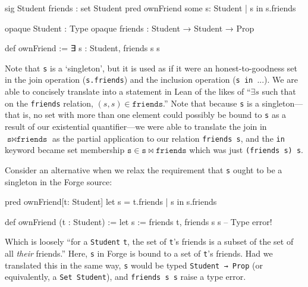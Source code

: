 \vspace{0.5em}
\noindent\begin{minipage}{0.5\textwidth}
\begin{forge*}
sig Student {
  friends : set Student
}
pred ownFriend {
  some s: Student |
    s in s.friends
}
\end{forge*}
\end{minipage}%
\begin{minipage}{0.5\textwidth}
\begin{lean*}
opaque Student : Type
opaque friends : Student → Student → Prop

def ownFriend := 
  ∃ s : Student, 
    friends s s

\end{lean*}
\end{minipage}
\vspace{0.5em}\newline
Note that \texttt{s} is a `singleton', but it is used as if it were an honest-to-goodness set in the join operation (\texttt{s.friends}) and the inclusion operation (\texttt{s in }...). We are able to concisely translate into a statement in Lean of the likes of ``$\exists s$ such that on the \texttt{friends} relation, $(s,s)\in \texttt{friends}$.'' Note that because \texttt{s} is a singleton---that is, no set with more than one element could possibly be bound to \texttt{s} as a result of our existential quantifier---we were able to translate the join in $\texttt{s} \bowtie \texttt{friends}$ as the partial application to our relation \texttt{friends s}, and the \texttt{in} keyword became set membership $\texttt{s}\in \texttt{s} \bowtie \texttt{friends}$ which was just \texttt{(friends s) s}. 

Consider an alternative when we relax the requirement that \texttt{s} ought to be a singleton in the Forge source: 

\vspace{0.5em}
\noindent\begin{minipage}{0.5\textwidth}
\begin{forge*}
pred ownFriend[t: Student] {
  let s = t.friends |
    s in s.friends
}
\end{forge*}
\end{minipage}%
\begin{minipage}{0.5\textwidth}
\begin{lean*}
def ownFriend (t : Student) := 
  let s := friends t, 
    friends s s -- Type error!

\end{lean*}
\end{minipage}
\vspace{0.5em}\newline
Which is loosely ``for a \texttt{Student} \texttt{t}, the set of \texttt{t}'s friends is a subset of the set of all \emph{their} friends.'' Here, \texttt{s} in Forge is bound to a set of \texttt{t}'s friends. Had we translated this in the same way, \texttt{s} would be typed \texttt{Student → Prop} (or equivalently, a \texttt{Set Student}), and \texttt{friends s s} raise a type error. 

